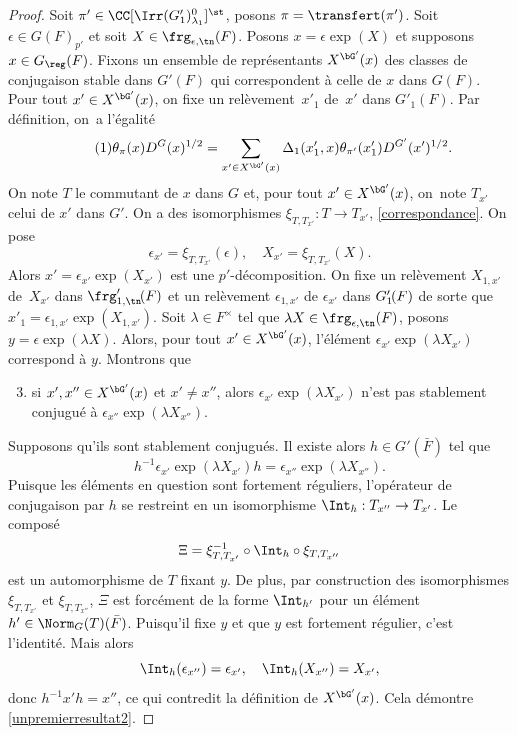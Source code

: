 \begin{proof}
Soit $\pi'\in \CC[\Irr(G'_{1})^0_{\lambda_{1}}]^{\st}$, posons $\pi=\transfert(\pi')$. Soit $\epsilon\in G(F)_{p'}$ et soit $X\in \frg_{\epsilon,\tn}(F)$. Posons $x=\epsilon \exp(X)$ et supposons $x\in G_{\reg}(F)$. Fixons un ensemble de représentants $X^{\bG'}(x)$ des classes de conjugaison stable dans $G'(F)$ qui correspondent à celle de $x$ dans $G(F)$. Pour tout $x'\in X^{\bG'}(x)$, on fixe un relèvement~$x'_{1}$ de~$x'$ dans $G'_{1}(F)$. Par définition, on~a l'égalité
\begin{equation}\tag{1}\label{unpremierresultat1}
\theta_{\pi}(x)D^G(x)^{1/2}=\sum_{x'\in X^{\bG'}(x)}\Delta_{1}(x'_{1},x)\theta_{\pi'}(x'_{1})D^{G'}(x')^{1/2}.
\end{equation}
On note $T$ le commutant de $x$ dans $G$ et, pour tout $x'\in X^{\bG'}(x)$, on~note $T_{x'}$ celui de $x'$ dans $G'$. On a des isomorphismes $\xi_{T,T_{x'}}:T\to T_{x'}$, \cf \ref{correspondance}. On pose
\[
\epsilon_{x'}=\xi_{T,T_{x'}}(\epsilon),\quad X_{x'}=\xi_{T,T_{x'}}(X).
\]
Alors $x'\!=\!\epsilon_{x'}\exp(X_{x'})$ est une $p'$-décomposition. On fixe un relèvement $X_{1,x'}$ de~$X_{x'}$ dans $\frg'_{1,\tn}\mkern-2.5mu(F)$ et un relèvement $\epsilon_{1,x'}$ de $\epsilon_{x'}$ dans $G'_{1}\mkern-2.5mu(F)$ de sorte que~\hbox{$x'_{1}\!\!=\!\epsilon_{1,x'}\exp(X_{1,x'})$}.
Soit $\lambda\in F^{\times}$ tel que $\lambda X\in \frg_{\epsilon,\tn}(F)$, posons $y=\epsilon \exp(\lambda X)$. Alors, pour tout $x'\in X^{\bG'}(x)$, l'élément $\epsilon_{x'}\exp(\lambda X_{x'})$ correspond à $ y$. Montrons que
\begin{enumerate}\setcounter{enumi}{2}
\item\label{unpremierresultat2}
si $x',x''\in X^{\bG'}(x)$ et $x'\neq x''$, alors $\epsilon_{x'}\exp(\lambda X_{x'})$ n'est pas stablement conjugué à $\epsilon_{x''}\exp(\lambda X_{x''})$.
\end{enumerate}

Supposons qu'ils sont stablement conjugués. Il existe alors $h\in G'(\bar{F})$ tel que
\[
h^{-1}\epsilon_{x'}\exp(\lambda X_{x'})h=\epsilon_{x''}\exp(\lambda X_{x''}).
\]
Puisque les éléments en question sont fortement réguliers, l'opérateur de conjugaison par $h$ se restreint en un isomorphisme $\Int_{h}:T_{x''}\to T_{x'}$. Le composé
\[
\Xi=\xi_{T,T_{x'}}^{-1}\circ \Int_{h}\circ\xi_{T,T_{x''}}
\]
est un automorphisme de $T$ fixant $y$. De plus, par construction des isomorphismes $\xi_{T,T_{x'}}$ et $\xi_{T,T_{x''}}$, $\Xi$ est forcément de la forme $\Int_{h'}$ pour un élément $h'\in \Norm_{G}(T)(\bar{F})$. Puisqu'il fixe $y$ et que $y$ est fortement régulier, c'est l'identité. Mais alors
\[
\Int_{h}(\epsilon_{x''})=\epsilon_{x'},\quad \Int_{h}(X_{x''})=X_{x'},
\]
donc $h^{-1}x'h=x''$, ce qui contredit la définition de $X^{\bG'}(x)$. Cela démontre \eqref{unpremierresultat2}.


\end{proof}
